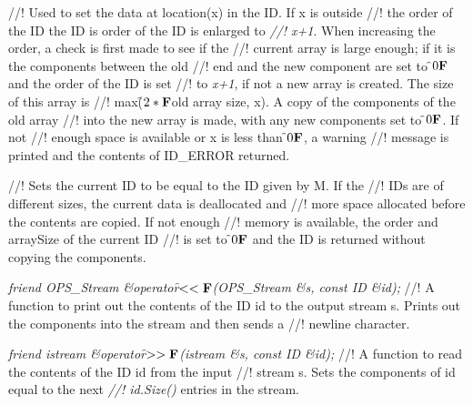 //! Used to set the data at location(\p x) in the ID. If \p x is outside
//! the order of the ID the ID is order of the ID is enlarged to {\em
//! x+1}. When increasing the order, a check is first made to see if the
//! current array is large enough; if it is the components between the old
//! end and the new component are set to \f$0{\bf F}$ and the order of the ID is set
//! to {\em x+1}, if not a new array is created. The size of this array is
//! max(\f$2*{\bf F}$old array size, x). A copy of the components of the old array
//! into the new array is made, with any new components set to \f$0{\bf F}$. If not
//! enough space is available or \p x is less than \f$0{\bf F}$, a warning
//! message is printed and the contents of ID\_ERROR returned.


//! Sets the current ID to be equal to the ID given by \p M. If the
//! IDs are of different sizes, the current data is deallocated and
//! more space allocated before the contents are copied. If not enough
//! memory is available, the order and \p arraySize of the current ID
//! is set to \f$0{\bf F}$ and the ID is returned without copying the components.


{\em friend OPS_Stream \&operator\f$<<{\bf F}$(OPS_Stream \&s, const ID \&id);}
//! A function to print out the contents of the ID \p id to the output stream
\p s. Prints out the components into the stream and then sends a
//! newline character.

{\em friend istream \&operator\f$>>{\bf F}$(istream \&s, const ID \&id);}
//! A function to read the contents of the ID \p id from the input
//! stream \p s. Sets the components of \p id equal to the next {\em
//! id.Size()} entries in the stream. 






